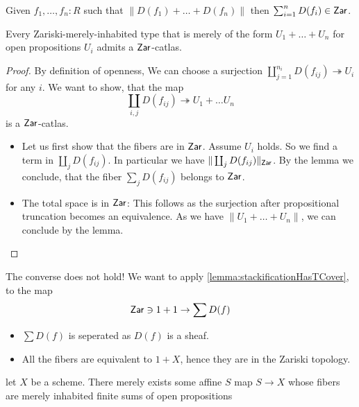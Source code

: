 \begin{lemma}
	Given $f_1, \hdots,f_n : R$ such that $\| D(f_1) + \hdots + D(f_n) \|$ then $\sum_{i=1}^n D(f_i) \in \mathsf{Zar}$.
\end{lemma}
\begin{prop}
	Every Zariski-merely-inhabited type that is merely of the form $U_1 + \hdots + U_n$ for open propositions $U_i$ admits a $\mathsf{Zar}$-catlas.
\end{prop}
\begin{proof}
	By definition of openness, We can choose a surjection $\coprod_{j=1}^{n_i} D(f_{ij}) \twoheadrightarrow U_i$ for any $i$. We want to show, that the map
	\[
	\coprod_{i , j} D(f_{ij}) \twoheadrightarrow U_1 + \hdots U_n
	\]
	is a $\mathsf{Zar}$-catlas. 
	\begin{itemize}
		\item Let us first show that the fibers are in $\mathsf{Zar}$. Assume $U_i$ holds. So we find a term in $\coprod_j D(f_{ij})$. In particular we have $\| \coprod_j D(f_{ij})\|_{\mathsf{Zar}}$. By the lemma we conclude, that the fiber $\sum_j D(f_{ij})$ belongs to $\mathsf{Zar}$.\\
		\item The total space is in $\mathsf{Zar}$: This follows as the surjection after propositional truncation becomes an equivalence. As we have $\| U_1 + \hdots + U_n\|$, we can conclude by the lemma.
	\end{itemize}
	
\end{proof}
\begin{warning}
	The converse does not hold! We want to apply \ref{lemma:stackificationHasTCover}, to the map
	\[\mathsf{Zar} \ni 1 + 1 \to \sum D(f) \]
	\begin{itemize}
		\item 	$\sum D(f)$ is seperated as $D(f)$ is a sheaf.
		\item 	All the fibers are equivalent to $1 + X$, hence they are in the Zariski topology.
	\end{itemize}	
\end{warning}
\begin{lemma}
	let $X$ be a scheme. There merely exists some affine $S$  map $S \to X$ whose fibers are merely inhabited finite sums of open propositions 
\end{lemma}

